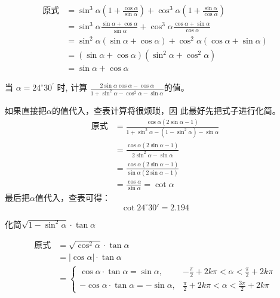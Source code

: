 \begin{solution}
\[\begin{split}
\text{原式}
    &=\sin ^{3} \alpha\left(1+\frac{\cos \alpha}{\sin \alpha}\right)+\cos ^{3} \alpha\left(1+\frac{\sin \alpha}{\cos \alpha}\right) \\
    &=\sin ^{3} \alpha \frac{\sin \alpha+\cos \alpha}{\sin \alpha}+\cos ^{3} \alpha \frac{\cos \alpha+\sin \alpha}{\cos \alpha} \\
    &=\sin ^{2} \alpha(\sin \alpha+\cos \alpha)+\cos ^{2} \alpha(\cos \alpha+\sin \alpha) \\
    &=(\sin \alpha+\cos \alpha)\left(\sin ^{2} \alpha+\cos ^{2} \alpha\right) \\
    &=\sin \alpha+\cos \alpha
\end{split}\]
\end{solution}

\begin{example}
    当 $\alpha=24^{\circ} 30^{\prime}$ 时, 计算
$
\frac{2 \sin \alpha \cos \alpha-\cos \alpha}{1+\sin ^{2} \alpha-\cos ^{2} \alpha-\sin \alpha}
$的值。
\end{example}

\begin{solution}
    如果直接把$\alpha$的值代入，查表计算将很烦琐，因
此最好先把式子进行化简。
\[\begin{split}
\text{原式}&=\frac{\cos\alpha(2\sin\alpha-1)}{1+\sin^2\alpha-(1-\sin^2\alpha)-\sin\alpha}\\
&=\frac{\cos\alpha(2\sin\alpha-1)}{2\sin^2\alpha-\sin\alpha}\\
&=\frac{\cos\alpha(2\sin\alpha-1)}{\sin\alpha(2\sin\alpha-1)}\\
&=\frac{\cos\alpha}{\sin\alpha}=\cot\alpha
\end{split}\]
最后把$\alpha$值代入，查表可得：
\[\cot24^{\circ}30'=2.194\]
\end{solution}


\begin{example}
    化简$\sqrt{1-\sin^2\alpha}\cdot \tan\alpha$
\end{example}

\begin{solution}
\[\begin{split}
    \text{原式}&=\sqrt{\cos^2\alpha}\cdot \tan\alpha\\
    &=|\cos\alpha|\cdot \tan\alpha\\
    &=\begin{cases}
   \cos\alpha\cdot \tan\alpha=\sin\alpha, & -\frac{\pi}{2}+2k\pi<\alpha<\frac{\pi}{2}+2k\pi\\
   -\cos\alpha\cdot \tan\alpha=-\sin\alpha, & \frac{\pi}{2}+2k\pi<\alpha<\frac{3\pi}{2}+2k\pi
    \end{cases}
\end{split}\]
\end{solution}

